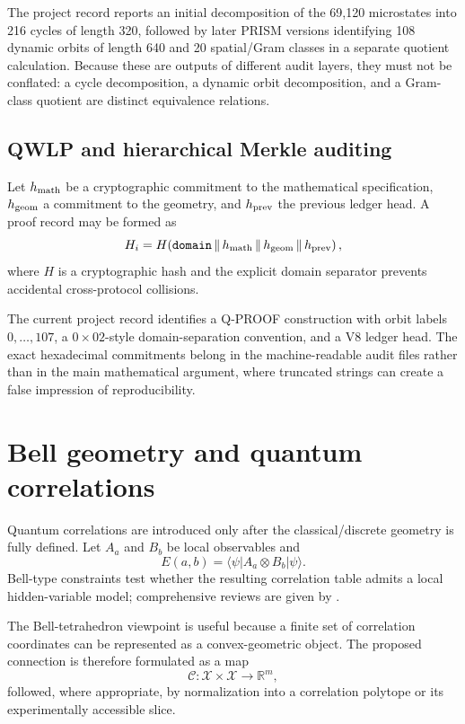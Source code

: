 \documentclass[11pt,a4paper]{article}
\numberwithin{equation}{section}
\newcommand{\R}{\mathbb{R}}
\newcommand{\XX}{\mathcal{X}}
\begin{document}
The project record reports an initial decomposition of the 69,120 microstates into 216 cycles of length 320, followed by later PRISM versions identifying 108 dynamic orbits of length 640 and 20 spatial/Gram classes in a separate quotient calculation. Because these are outputs of different audit layers, they must not be conflated: a cycle decomposition, a dynamic orbit decomposition, and a Gram-class quotient are distinct equivalence relations.

\subsection{QWLP and hierarchical Merkle auditing}

Let $h_{\rm math}$ be a cryptographic commitment to the mathematical specification, $h_{\rm geom}$ a commitment to the geometry, and $h_{\rm prev}$ the previous ledger head. A proof record may be formed as
\begin{equation}
H_i=H\!\left(\texttt{domain}\,\|\,h_{\rm math}\,\|\,h_{\rm geom}\,\|\,h_{\rm prev}\right),
\end{equation}
where $H$ is a cryptographic hash and the explicit domain separator prevents accidental cross-protocol collisions.

The current project record identifies a Q-PROOF construction with orbit labels $0,\ldots,107$, a $0\times02$-style domain-separation convention, and a V8 ledger head. The exact hexadecimal commitments belong in the machine-readable audit files rather than in the main mathematical argument, where truncated strings can create a false impression of reproducibility.

\section{Bell geometry and quantum correlations}
\label{sec:bell}

Quantum correlations are introduced only after the classical/discrete geometry is fully defined. Let $A_a$ and $B_b$ be local observables and
\begin{equation}
E(a,b)=\langle\psi|A_a\otimes B_b|\psi\rangle.
\end{equation}
Bell-type constraints test whether the resulting correlation table admits a local hidden-variable model; comprehensive reviews are given by \citet{Brunner2014}.

The Bell-tetrahedron viewpoint is useful because a finite set of correlation coordinates can be represented as a convex-geometric object. The proposed connection is therefore formulated as a map
\begin{equation}
\mathcal C:\XX\times\XX\rightarrow\R^m,
\end{equation}
followed, where appropriate, by normalization into a correlation polytope or its experimentally accessible slice.
\end{document}
